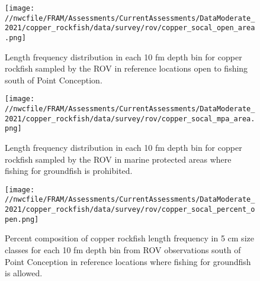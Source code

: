 \documentclass[11pt,
  english,
  a4paper,
]{article}
\begin{document}
\begin{figure}
\centering
\texttt{[image: //nwcfile/FRAM/Assessments/CurrentAssessments/DataModerate\_2021/copper\_rockfish/data/survey/rov/copper\_socal\_open\_area.png]}
\caption{Length frequency distribution in each 10 fm depth bin for copper rockfish sampled by the ROV in reference locations open to fishing south of Point Conception.\label{fig:rov-open}}
\end{figure}

\tagmcend\tagstructend

\clearpage


\begin{figure}
\centering
\texttt{[image: //nwcfile/FRAM/Assessments/CurrentAssessments/DataModerate\_2021/copper\_rockfish/data/survey/rov/copper\_socal\_mpa\_area.png]}
\caption{Length frequency distribution in each 10 fm depth bin for copper rockfish sampled by the ROV in marine protected areas where fishing for groundfish is prohibited.\label{fig:rov-mpa}}
\end{figure}

\tagmcend\tagstructend

\clearpage


\begin{figure}
\centering
\texttt{[image: //nwcfile/FRAM/Assessments/CurrentAssessments/DataModerate\_2021/copper\_rockfish/data/survey/rov/copper\_socal\_percent\_open.png]}
\caption{Percent composition of copper rockfish length frequency in 5 cm size classes for each 10 fm depth bin from ROV observations south of Point Conception in reference locations where fishing for groundfish is allowed.\label{fig:rov-percent-open}}
\end{figure}

\tagmcend\tagstructend

\clearpage

\end{document}
